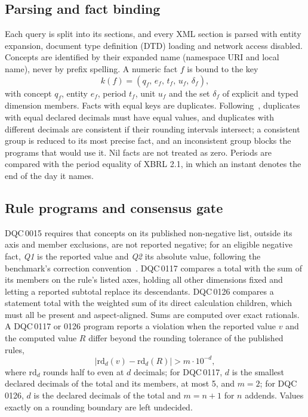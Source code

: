 \documentclass[conference]{IEEEtran}
\newcommand{\DQC}[1]{DQC\,#1}
\newcommand{\QA}{\textit{Q1}}
\newcommand{\QB}{\textit{Q2}}
\newcommand{\rd}{\mathrm{rd}}
\begin{document}
\subsection{Parsing and fact binding}
Each query is split into its sections, and every XML section is parsed with entity expansion, document type definition (DTD) loading and network access disabled. Concepts are identified by their expanded name (namespace URI and local name), never by prefix spelling. A numeric fact $f$ is bound to the key
\begin{equation}
k(f)=(q_f,\,e_f,\,t_f,\,u_f,\,\delta_f),
\label{eq:key}
\end{equation}
with concept $q_f$, entity $e_f$, period $t_f$, unit $u_f$ and the set $\delta_f$ of explicit and typed dimension members. Facts with equal keys are duplicates. Following~\cite{xbrlduplicates}, duplicates with equal declared decimals must have equal values, and duplicates with different decimals are consistent if their rounding intervals intersect; a consistent group is reduced to its most precise fact, and an inconsistent group blocks the programs that would use it. Nil facts are not treated as zero. Periods are compared with the period equality of XBRL 2.1, in which an instant denotes the end of the day it names.

\subsection{Rule programs and consensus gate}
\DQC{0015} requires that concepts on its published non-negative list, outside its axis and member exclusions, are not reported negative; for an eligible negative fact, \QA{} is the reported value and \QB{} its absolute value, following the benchmark's correction convention~\cite{task3results}. \DQC{0117} compares a total with the sum of its members on the rule's listed axes, holding all other dimensions fixed and letting a reported subtotal replace its descendants. \DQC{0126} compares a statement total with the weighted sum of its direct calculation children, which must all be present and aspect-aligned. Sums are computed over exact rationals. A \DQC{0117} or 0126 program reports a violation when the reported value $v$ and the computed value $R$ differ beyond the rounding tolerance of the published rules,
\begin{equation}
|\rd_d(v)-\rd_d(R)|>m\cdot 10^{-d},
\label{eq:tolerance}
\end{equation}
where $\rd_d$ rounds half to even at $d$ decimals; for \DQC{0117}, $d$ is the smallest declared decimals of the total and its members, at most 5, and $m=2$; for \DQC{0126}, $d$ is the declared decimals of the total and $m=n+1$ for $n$ addends. Values exactly on a rounding boundary are left undecided.
\end{document}
